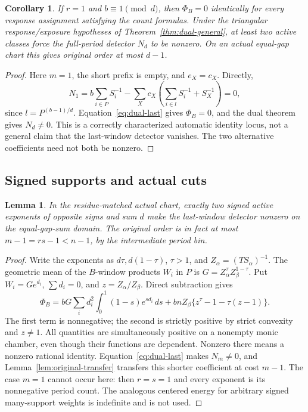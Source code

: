 \documentclass[11pt,a4paper]{amsart}
\numberwithin{equation}{section}
\theoremstyle{plain}
\newtheorem{lemma}[theorem]{Lemma}
\newtheorem{corollary}[theorem]{Corollary}
\theoremstyle{definition}
\begin{document}
\begin{corollary}\label{cor:automatic-open}
If \(r=1\) and \(b\equiv1\pmod d\), then \(\Phi_B=0\) identically for every response assignment satisfying the count formulas.  Under the triangular response/exposure hypotheses of Theorem~\ref{thm:dual-general}, at least two active classes force the full-period detector \(N_d\) to be nonzero.  On an actual equal-gap chart this gives original order at most \(d-1\).
\end{corollary}
\begin{proof}
Here \(m=1\), the short prefix is empty, and \(e_X=c_X\).  Directly,
\[
 N_1=b\sum_{i\in P}S_i^{-1}
 -\sum_Xc_X\left(\sum_{i\in l}S_i^{-1}+S_X^{-1}\right)=0,
\]
since \(l=P^{(b-1)/d}\).  Equation~\eqref{eq:dual-last} gives \(\Phi_B=0\), and the dual theorem gives \(N_d\ne0\).  This is a correctly characterized automatic identity locus, not a general claim that the last-window detector vanishes.  The two alternative coefficients need not both be nonzero.
\end{proof}

\subsection{Signed supports and actual cuts}

\begin{lemma}\label{lem:two-support}
In the residue-matched actual chart, exactly two signed active exponents of opposite signs and sum \(d\) make the last-window detector nonzero on the equal-gap-sum domain.  The original order is in fact at most \(m-1=rs-1<n-1\), by the intermediate period bin.
\end{lemma}
\begin{proof}
Write the exponents as \(d\tau,d(1-\tau)\), \(\tau>1\), and \(Z_\alpha=(TS_\alpha)^{-1}\).  The geometric mean of the \(B\)-window products \(W_i\) in \(P\) is \(G=Z_\alpha^\tau Z_\beta^{1-\tau}\).  Put \(W_i=G e^{d_i}\), \(\sum d_i=0\), and \(z=Z_\alpha/Z_\beta\).  Direct subtraction gives
\[
 \Phi_B=bG\sum_i d_i^2\int_0^1(1-s)e^{sd_i}\,ds
 +bnZ_\beta\{z^\tau-1-\tau(z-1)\}.
\]
The first term is nonnegative; the second is strictly positive by strict convexity and \(z\ne1\).  All quantities are simultaneously positive on a nonempty monic chamber, even though their functions are dependent.  Nonzero there means a nonzero rational identity.  Equation~\eqref{eq:dual-last} makes \(N_m\ne0\), and Lemma~\ref{lem:original-transfer} transfers this shorter coefficient at cost \(m-1\).  The case \(m=1\) cannot occur here: then \(r=s=1\) and every exponent is its nonnegative period count.  The analogous centered energy for arbitrary signed many-support weights is indefinite and is not used.
\end{proof}
\end{document}
